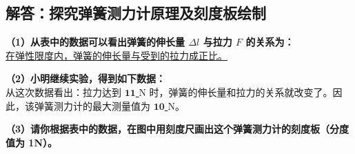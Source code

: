 ﻿%

\subsection{解答：探究弹簧测力计原理及刻度板绘制}

\vspace{0.6cm}

\textbf{（1）从表中的数据可以看出弹簧的伸长量 $\Delta l$ 与拉力 $F$ 的关系为：}\\
\underline{\quad 在弹性限度内，弹簧的伸长量与受到的拉力成正比。\quad}

\vspace{0.4cm}

\textbf{（2）小明继续实验，得到如下数据：} \\
从这次数据看出：拉力达到 \underline{\quad $\textbf{11}$ \quad} N 时，弹簧的伸长量和拉力的关系就改变了。因此，该弹簧测力计的最大测量值为 \underline{\quad $\textbf{10}$ \quad} N。

\vspace{0.4cm}

\textbf{（3）请你根据表中的数据，在图中用刻度尺画出这个弹簧测力计的刻度板（分度值为 1N）。}

\vspace{0.4cm}

